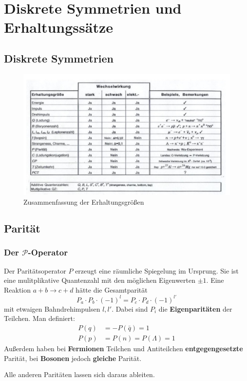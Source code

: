 \chapter{Diskrete Symmetrien und Erhaltungssätze}
\section{Diskrete Symmetrien}
\begin{figure}[h!]
	\centering
	\includegraphics[width=.7\textwidth]{./img/symmetries.jpg}
	\caption{Zusammenfassung der Erhaltungsgrößen}
	\label{fig:symmetries}
\end{figure}

\section{Parität}
\subsection{Der $\mathcal{P}$-Operator}
Der Paritätsoperator $P$ erzeugt eine räumliche Spiegelung im Ursprung.
Sie ist eine mulitplikative Quantenzahl mit den möglichen Eigenwerten $\pm 1$.
Eine Reaktion $a+b\longrightarrow c+d$ hätte die Gesamtparität
\begin{equation*}
	P_a\cdot P_b\cdot (-1)^l = P_c\cdot P_d\cdot (-1)^{l'}
\end{equation*}
mit etwaigen Bahndrehimpulsen $l,l'$.
Dabei sind $P_i$ die \textbf{Eigenparitäten} der Teilchen.
Man definiert:
\begin{align*}
	P(q) &= -P(\bar{q}) = 1 \\
	P(p) &= P(n) = P(\Lambda) = 1
\end{align*}
Außerdem haben bei \textbf{Fermionen} Teilchen und Antiteilchen \textbf{entgegengesetzte} Parität,
bei \textbf{Bosonen} jedoch \textbf{gleiche} Parität.

Alle anderen Paritäten lassen sich daraus ableiten.

